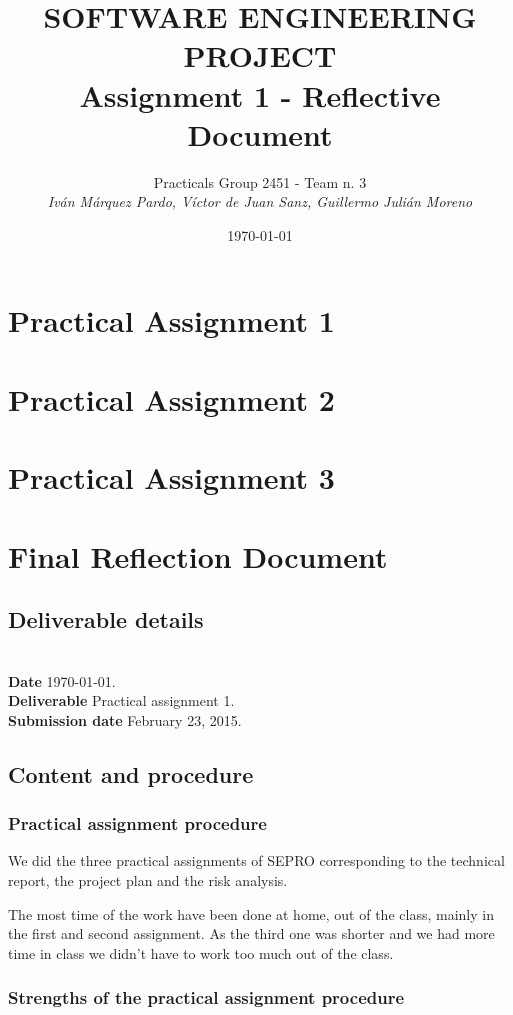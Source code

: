 \documentclass{report}
\title{SOFTWARE ENGINEERING PROJECT\\Assignment 1 - Reflective Document}
\date{\today}
\author{Practicals Group 2451 - Team n. 3 \\ \vspace{5pt} \textit{Iván Márquez Pardo, Víctor de Juan Sanz, Guillermo Julián Moreno}}
\newcommand{\header}[1]{\\ \indent \textbf{#1}\hspace{10pt}}
\begin{document}
\maketitle
\pagestyle{plain}
\chapter{Practical Assignment 1}

\chapter{Practical Assignment 2}

\chapter{Practical Assignment 3}



\chapter{Final Reflection Document}

\section{Deliverable details}

\noindent
\header{Date} \today.
\header{Deliverable} Practical assignment 1.
\header{Submission date} February 23, 2015.

\section{Content and procedure}
\subsection{Practical assignment procedure}
We did the three practical assignments of SEPRO corresponding to the technical report, the project plan and the risk analysis.

The most time of the work have been done at home, out of the class, mainly in the first and second assignment. As the third one was shorter and we had more time in class we didn't have to work too much out of the class.

\subsection{Strengths of the practical assignment procedure}
\end{document}
